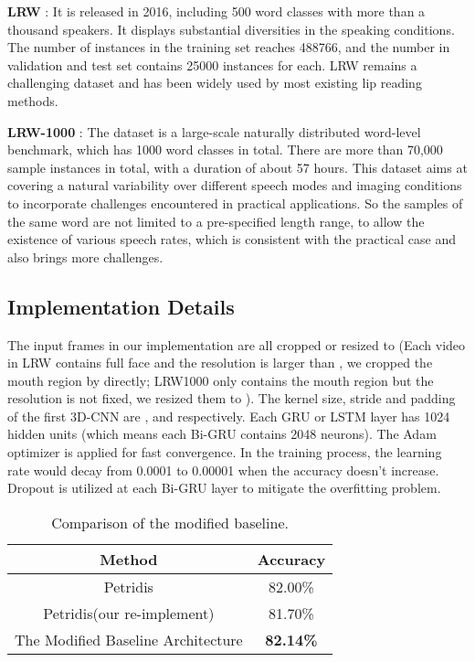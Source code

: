 \documentclass[a4paper, 10pt, conference]{ieeeconf}      \usepackage{FG2020}
\begin{document}
\textbf{LRW} \cite{chung2016lip}: It is released in 2016, including 500 word classes with more than a thousand speakers. It displays substantial diversities in the speaking conditions. The number of instances in the training set reaches 488766, and the number in validation and test set contains 25000 instances for each. LRW remains a challenging dataset and has been widely used by most existing lip reading methods.

\textbf{LRW-1000} \cite{yang2018lrw}: The dataset is a large-scale naturally distributed word-level benchmark, which has 1000 word classes in total. There are more than 70,000 sample instances in total, with a duration of about 57 hours. This dataset aims at covering a natural variability over different speech modes and imaging conditions to incorporate challenges encountered in practical applications. So the samples of the same word are not limited to a pre-specified length range, to allow the existence of various speech rates, which is consistent with the practical case and also brings more challenges. 
\subsection{Implementation Details}
The input frames in our implementation are all cropped or resized to  (Each video in LRW contains full face and the resolution is larger than , we cropped the mouth region by  directly; LRW1000 only contains the mouth region but the resolution is not fixed, we resized them to ). The kernel size, stride and padding of the first 3D-CNN are ,  and  respectively. Each GRU or LSTM layer has 1024 hidden units (which means each Bi-GRU contains 2048 neurons). The Adam optimizer is applied for fast convergence. In the training process, the learning rate would decay from 0.0001 to 0.00001 when the accuracy doesn't increase. Dropout is utilized at each Bi-GRU layer to mitigate the overfitting problem.
\begin{table}[b]
\caption{Comparison of the modified baseline.}
\label{table1}
\begin{center}
\begin{tabular}{|c||c|}
\hline
Method & Accuracy\\
\hline
Petridis\cite{petridis2018end} & 82.00\% \\
\hline
Petridis\cite{petridis2018end}(our re-implement) & 81.70\% \\
\hline\hline
The Modified Baseline Architecture & \textbf{82.14\%}\\
\hline
\end{tabular}
\end{center}
\end{table}
\end{document}
